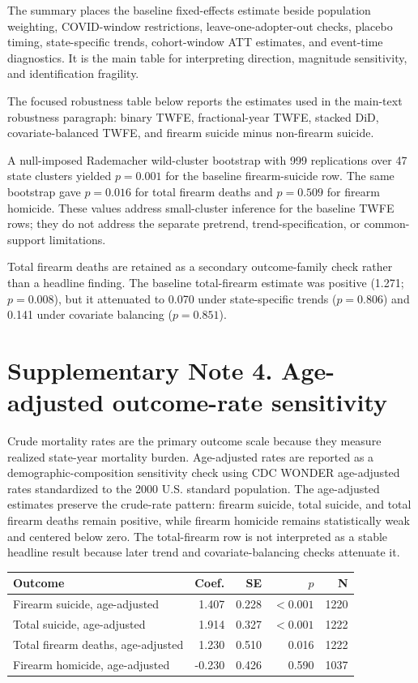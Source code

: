 \documentclass[10pt]{article}
\begin{document}
The summary places the baseline fixed-effects estimate beside population weighting, COVID-window restrictions, leave-one-adopter-out checks, placebo timing, state-specific trends, cohort-window ATT estimates, and event-time diagnostics. It is the main table for interpreting direction, magnitude sensitivity, and identification fragility.



The focused robustness table below reports the estimates used in the main-text robustness paragraph: binary TWFE, fractional-year TWFE, stacked DiD, covariate-balanced TWFE, and firearm suicide minus non-firearm suicide.



A null-imposed Rademacher wild-cluster bootstrap with 999 replications over 47 state clusters yielded $p=0.001$ for the baseline firearm-suicide row. The same bootstrap gave $p=0.016$ for total firearm deaths and $p=0.509$ for firearm homicide. These values address small-cluster inference for the baseline TWFE rows; they do not address the separate pretrend, trend-specification, or common-support limitations.

Total firearm deaths are retained as a secondary outcome-family check rather than a headline finding. The baseline total-firearm estimate was positive (1.271; $p=0.008$), but it attenuated to 0.070 under state-specific trends ($p=0.806$) and 0.141 under covariate balancing ($p=0.851$).

\section*{Supplementary Note 4. Age-adjusted outcome-rate sensitivity}

Crude mortality rates are the primary outcome scale because they measure realized state-year mortality burden. Age-adjusted rates are reported as a demographic-composition sensitivity check using CDC WONDER age-adjusted rates standardized to the 2000 U.S. standard population. The age-adjusted estimates preserve the crude-rate pattern: firearm suicide, total suicide, and total firearm deaths remain positive, while firearm homicide remains statistically weak and centered below zero. The total-firearm row is not interpreted as a stable headline result because later trend and covariate-balancing checks attenuate it.

\begin{center}
\begin{tabular}{lrrrr}
\toprule
Outcome & Coef. & SE & $p$ & N \\
\midrule
Firearm suicide, age-adjusted & 1.407 & 0.228 & $<0.001$ & 1220 \\
Total suicide, age-adjusted & 1.914 & 0.327 & $<0.001$ & 1222 \\
Total firearm deaths, age-adjusted & 1.230 & 0.510 & 0.016 & 1222 \\
Firearm homicide, age-adjusted & -0.230 & 0.426 & 0.590 & 1037 \\
\bottomrule
\end{tabular}
\end{center}
\end{document}
